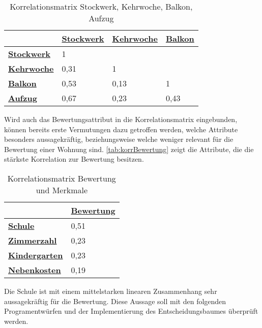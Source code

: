 \useunder{\uline}{\ul}{}
\begin{table}[h]
    \begin{center}
        \begin{tabular}{|l|l|l|l|}
        \hline
            {\ul \textbf{}}              & {\ul \textbf{Stockwerk}} & {\ul \textbf{Kehrwoche}}  & {\ul \textbf{Balkon}} \\ \hline
            {\ul \textbf{Stockwerk}}     & 1                        &                           &                       \\ \hline
            {\ul \textbf{Kehrwoche}}     & 0,31                     & 1                         &                       \\ \hline
            {\ul \textbf{Balkon}}        & 0,53                     & 0,13                      & 1                     \\ \hline
            {\ul \textbf{Aufzug}}        & 0,67                     & 0,23                      & 0,43                  \\ \hline
        \end{tabular}
        \caption{Korrelationsmatrix Stockwerk, Kehrwoche, Balkon, Aufzug}
        \label{tab:korr2}
    \end{center}
\end{table}

Wird auch das Bewertungsattribut in die Korrelationsmatrix eingebunden, können bereits erste Vermutungen dazu getroffen werden,
welche Attribute besonders aussagekräftig, beziehungsweise welche weniger relevant für die Bewertung einer Wohnung sind.
\autoref{tab:korrBewertung} zeigt die Attribute, die die stärkste Korrelation zur Bewertung besitzen.
\useunder{\uline}{\ul}{}
\begin{table}[h]
    \begin{center}
        \begin{tabular}{|l|l|}
            \hline
            {\ul \textbf{}}              & {\ul \textbf{Bewertung}} \\ \hline
            {\ul \textbf{Schule}}        & 0,51                        \\ \hline
            {\ul \textbf{Zimmerzahl}}    & 0,23                     \\ \hline
            {\ul \textbf{Kindergarten}}  & 0,23                     \\ \hline
            {\ul \textbf{Nebenkosten}}   & 0,19                     \\ \hline
        \end{tabular}
        \caption{Korrelationsmatrix Bewertung und Merkmale}
        \label{tab:korrBewertung}
    \end{center}
\end{table}

Die Schule ist mit einem mittelstarken linearen Zusammenhang sehr aussagekräftig für die Bewertung.
Diese Aussage soll mit den folgenden Programentwürfen und der Implementierung des Entscheidungsbaumes
überprüft werden.